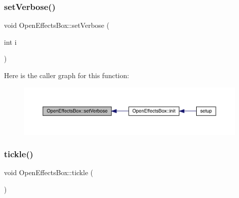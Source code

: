 \subsubsection{\texorpdfstring{set\+Verbose()}{setVerbose()}}
{\footnotesize\ttfamily void Open\+Effects\+Box\+::set\+Verbose (\begin{DoxyParamCaption}\item[{int}]{i }\end{DoxyParamCaption})}

Here is the caller graph for this function\+:\nopagebreak
\begin{figure}[H]
\begin{center}
\leavevmode
\includegraphics[width=350pt]{class_open_effects_box_a9e14e8a10c05e2aedacf1f8684e5abab_icgraph}
\end{center}
\end{figure}
\mbox{\label{class_open_effects_box_a5ce71cb124645f49096492bc37cc0603}} 
\subsubsection{\texorpdfstring{tickle()}{tickle()}}
{\footnotesize\ttfamily void Open\+Effects\+Box\+::tickle (\begin{DoxyParamCaption}{ }\end{DoxyParamCaption})}

